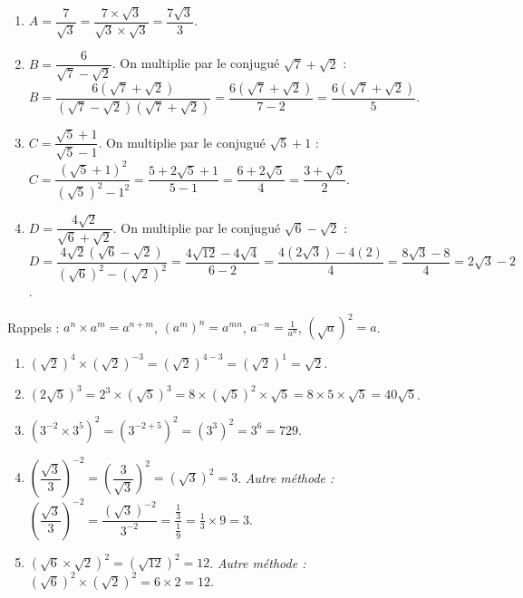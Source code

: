 \documentclass[11pt]{article}
\newcommand{\cle}[1]{{\popxbold\color{popdark}#1}}
\begin{document}
\begin{corrige}
\begin{enumerate}
    \item $A = \dfrac{7}{\sqrt{3}} = \dfrac{7 \times \sqrt{3}}{\sqrt{3} \times \sqrt{3}} = \dfrac{7\sqrt{3}}{3}$.
    \item $B = \dfrac{6}{\sqrt{7} - \sqrt{2}}$. On multiplie par le \cle{conjugué} $\sqrt{7} + \sqrt{2}$ :
    $B = \dfrac{6(\sqrt{7} + \sqrt{2})}{(\sqrt{7} - \sqrt{2})(\sqrt{7} + \sqrt{2})} = \dfrac{6(\sqrt{7} + \sqrt{2})}{7 - 2} = \dfrac{6(\sqrt{7} + \sqrt{2})}{5}$.
    \item $C = \dfrac{\sqrt{5} + 1}{\sqrt{5} - 1}$. On multiplie par le conjugué $\sqrt{5} + 1$ :
    $C = \dfrac{(\sqrt{5} + 1)^2}{(\sqrt{5})^2 - 1^2} = \dfrac{5 + 2\sqrt{5} + 1}{5 - 1} = \dfrac{6 + 2\sqrt{5}}{4} = \dfrac{3 + \sqrt{5}}{2}$.
    \item $D = \dfrac{4\sqrt{2}}{\sqrt{6} + \sqrt{2}}$. On multiplie par le conjugué $\sqrt{6} - \sqrt{2}$ :
    $D = \dfrac{4\sqrt{2}(\sqrt{6} - \sqrt{2})}{(\sqrt{6})^2 - (\sqrt{2})^2} = \dfrac{4\sqrt{12} - 4\sqrt{4}}{6 - 2} = \dfrac{4(2\sqrt{3}) - 4(2)}{4} = \dfrac{8\sqrt{3} - 8}{4} = 2\sqrt{3} - 2$.
\end{enumerate}
\end{corrige}

\begin{corrige}
Rappels : $a^n \times a^m = a^{n+m}$, $(a^m)^n = a^{mn}$, $a^{-n} = \frac{1}{a^n}$, $(\sqrt{a})^2 = a$.
\begin{enumerate}
    \item $(\sqrt{2})^4 \times (\sqrt{2})^{-3} = (\sqrt{2})^{4-3} = (\sqrt{2})^1 = \sqrt{2}$.
    \item $(2\sqrt{5})^3 = 2^3 \times (\sqrt{5})^3 = 8 \times (\sqrt{5})^2 \times \sqrt{5} = 8 \times 5 \times \sqrt{5} = 40\sqrt{5}$.
    \item $(3^{-2} \times 3^5)^2 = (3^{-2+5})^2 = (3^3)^2 = 3^{6} = 729$.
    \item $\left(\dfrac{\sqrt{3}}{3}\right)^{-2} = \left(\dfrac{3}{\sqrt{3}}\right)^{2} = \left(\sqrt{3}\right)^2 = 3$. \textit{Autre méthode :} $\left(\dfrac{\sqrt{3}}{3}\right)^{-2} = \dfrac{(\sqrt{3})^{-2}}{3^{-2}} = \dfrac{\frac{1}{3}}{\frac{1}{9}} = \frac{1}{3} \times 9 = 3$.
    \item $(\sqrt{6} \times \sqrt{2})^2 = (\sqrt{12})^2 = 12$. \textit{Autre méthode :} $(\sqrt{6})^2 \times (\sqrt{2})^2 = 6 \times 2 = 12$.
\end{enumerate}
\end{corrige}
\end{document}
